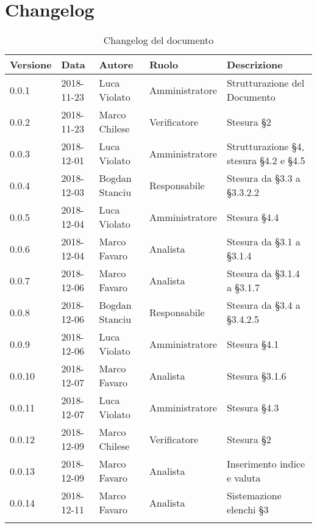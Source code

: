 \section{Changelog}

\begin{center}
\begin{longtable}[c]{|m{}|m{}|m{}|m{}|p{}|}
\hline
\textbf{Versione} & \textbf{Data} & \textbf{Autore} & \textbf{Ruolo} & \textbf{Descrizione} \\
\hline \hline
\endfirsthead
0.0.1 & 2018-11-23 & Luca Violato & Amministratore & Strutturazione del Documento \\
\hline
0.0.2 & 2018-11-23 & Marco Chilese & Verificatore & Stesura §2\\
\hline
0.0.3 & 2018-12-01 & Luca Violato & Amministratore & Strutturazione §4, stesura §4.2 e §4.5 \\
\hline
0.0.4 & 2018-12-03 & Bogdan Stanciu & Responsabile & Stesura da §3.3 a §3.3.2.2 \\
\hline
0.0.5 & 2018-12-04 & Luca Violato & Amministratore & Stesura §4.4 \\
\hline
0.0.6 & 2018-12-04 & Marco Favaro & Analista & Stesura da §3.1 a §3.1.4 \\
\hline
0.0.7 & 2018-12-06 & Marco Favaro & Analista & Stesura da §3.1.4 a §3.1.7 \\
\hline
0.0.8 & 2018-12-06 & Bogdan Stanciu & Responsabile & Stesura da §3.4 a §3.4.2.5 \\
\hline
0.0.9 & 2018-12-06 & Luca Violato & Amministratore & Stesura §4.1\\
\hline
0.0.10 & 2018-12-07 & Marco Favaro & Analista & Stesura §3.1.6\\
\hline
0.0.11 & 2018-12-07 & Luca Violato & Amministratore & Stesura §4.3\\
\hline
0.0.12 & 2018-12-09 & Marco Chilese & Verificatore & Stesura §2\\
\hline
0.0.13 & 2018-12-09 & Marco Favaro & Analista & Inserimento indice e valuta\\
\hline
0.0.14 & 2018-12-11 & Marco Favaro & Analista & Sistemazione elenchi §3\\
\hline
\caption{Changelog del documento}
\end{longtable}
\end{center}